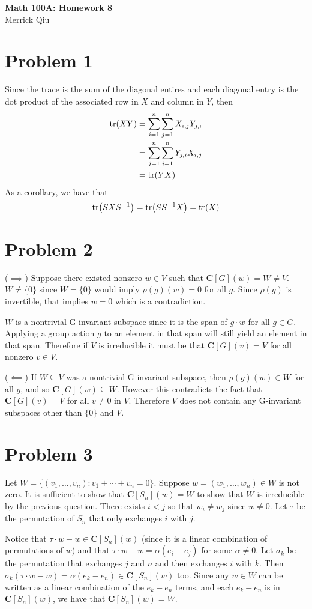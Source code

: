 \documentclass{article}
\begin{document}
\begin{center}
	\huge{\bf Math 100A: Homework 8} \\
	Merrick Qiu
\end{center}

\section*{Problem 1}
Since the trace is the sum of the diagonal entires 
and each diagonal entry is the dot product of the 
associated row in $X$ and column in $Y$, then
\begin{align*}
	\tr(XY) &= \sum_{i=1}^n \sum_{j=1}^n X_{i,j}Y_{j,i} \\
	&= \sum_{j=1}^n \sum_{i=1}^n Y_{j,i}X_{i,j} \\
	&= \tr(YX)
\end{align*}
As a corollary, we have that
\[
	\tr(SXS^{-1}) = \tr(SS^{-1}X) = \tr(X)
\]
\newpage 

\section*{Problem 2}
($\implies$) Suppose there existed nonzero $w \in V$
such that $\textbf{C}[G](w) = W \neq V$.
$W \neq \{0\}$ since $W = \{0\}$ would imply $\rho(g)(w) = 0$
for all $g$.  Since $\rho(g)$ is invertible,
that implies $w=0$ which is a contradiction.

$W$ is a nontrivial G-invariant subspace
since it is the span of $g\cdot w$ for all $g\in G$.
Applying a group action $g$ to an element in that span 
will still yield an element in that span.
Therefore if $V$ is irreducible it must be that 
$\textbf{C}[G](v) = V$ for all nonzero $v\in V$.

($\impliedby$) 
If $W \subseteq V$ was a nontrivial G-invariant subspace,
then $\rho(g)(w) \in W$ for all $g$, and so 
$\textbf{C}[G](w) \subseteq W$.
However this contradicts the fact that 
$\textbf{C}[G](v) = V$ for all $v \neq 0$ in $V$.
Therefore $V$ does not contain any G-invariant subspaces 
other than $\{0\}$ and $V$.
\newpage 

\section*{Problem 3}
Let $W= \{(v_1,\ldots,v_n): v_1+\cdots+v_n = 0\}$.
Suppose $w=(w_1,\ldots,w_n) \in W$ is not zero.
It is sufficient to show that $\textbf{C}[S_n](w) = W$ to show that 
$W$ is irreducible by the previous question.
There exists $i<j$ so that $w_i \neq w_j$ since $w \neq 0$.
Let $\tau$ be the permutation of $S_n$ that 
only exchanges $i$ with $j$.


Notice that $\tau\cdot w - w \in \textbf{C}[S_n](w)$
(since it is a linear combination of permutations of $w$)
and that $\tau\cdot w - w = \alpha(e_i - e_j)$ for some $\alpha \neq 0$. 
Let $\sigma_k$ be the permutation that exchanges $j$ and $n$ and then
exchanges $i$ with $k$.
Then $\sigma_k(\tau\cdot w - w) = \alpha(e_{k} - e_{n}) \in \textbf{C}[S_n](w)$ too.
Since any $w \in W$ can be written as a linear combination of the $e_{k} - e_{n}$ terms,
and each  $e_{k} - e_{n}$ is in $\textbf{C}[S_n](w)$,
we have that $\textbf{C}[S_n](w) = W$.
\end{document}
